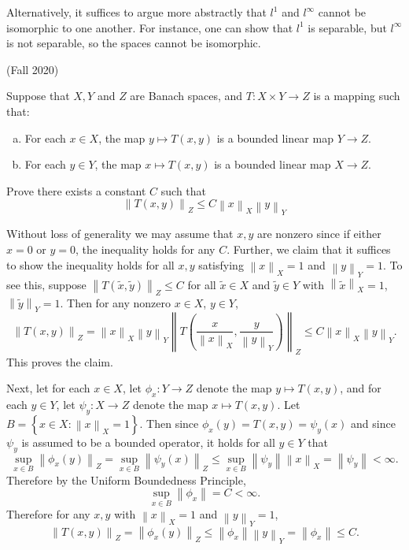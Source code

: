 \documentclass{exam}
\theoremstyle{problemstyle}
\newcommand{\norm}[1]{\left\lVert#1\right\rVert} %
\newcommand{\1}[1]{\textbf{1}_{\left[#1\right]}} %
\begin{document}
\begin{questions}
\begin{solution}
    Alternatively, it suffices to argue more abstractly that $l^1$ and $l^\infty$ cannot be isomorphic to one another. For instance, one can show that $l^1$ is separable, but $l^\infty$ is not separable, so the spaces cannot be isomorphic.
\end{solution}

\question (Fall 2020)

Suppose that $X,Y$ and $Z$ are Banach spaces, and $T:X\times Y\to Z$ is a mapping such that:
\begin{enumerate}[(a)]
\item For each $x\in X$, the map $y\mapsto T(x,y)$ is a bounded linear map $Y\to Z$.
\item For each $y\in Y$, the map $x\mapsto T(x,y)$ is a bounded linear map $X\to Z$.
\end{enumerate}
Prove there exists a constant $C$ such that
\begin{equation*}
\norm{T(x,y)}_{Z}\leq C \norm{x}_{X}\norm{y}_{Y}
\end{equation*}

\begin{solution}
  Without loss of generality we may assume that $x,y$ are nonzero since if either $x=0$ or $y=0$, the inequality holds for any $C$. Further, we claim that it suffices to show the inequality holds for all $x,y$ satisfying $\norm{x}_{X}=1$ and $\norm{y}_{Y}=1.$ To see this, suppose $\norm{T(\tilde{x},\tilde{y})}_{Z}\leq C$ for all $\tilde{x}\in X$ and $\tilde{y}\in Y$ with $\norm{\tilde{x}}_{X}=1$, $\norm{\tilde{y}}_{Y}=1$. Then for any nonzero $x\in X$, $y\in Y$,
  \begin{equation*}
    \norm{T(x,y)}_{Z}= \norm{x}_{X}\norm{y}_{Y}\norm{T \left( \frac{x}{\norm{x}_{X}},\frac{y}{\norm{y}_{Y}} \right)}_{Z} \leq C \norm{x}_{X}\norm{y}_{Y}.
  \end{equation*}
  This proves the claim.

  Next, let for each $x\in X$, let $\phi_{x}:Y\to Z$ denote the map $y\mapsto T(x,y)$, and for each $y\in Y$, let $\psi_{y}:X\to Z$ denote the map $x\mapsto T(x,y)$. Let $B= \left\{ x\in X: \norm{x}_{X}=1 \right\}$. Then since $\phi_{x}(y)=T(x,y)=\psi_{y}(x)$ and since $\psi_{y}$ is assumed to be a bounded operator, it holds for all $y\in Y$ that
  \begin{equation*}
    \sup_{x\in B}\norm{\phi_{x}(y)}_{Z} = \sup_{x\in B}\norm{\psi_{y}(x)}_{Z} \leq \sup_{x\in B}\norm{\psi_{y}} \norm{x}_{X} = \norm{\psi_{y}} <\infty.
  \end{equation*}
  Therefore by the Uniform Boundedness Principle,
  \begin{equation*}
    \sup_{x\in B}\norm{\phi_{x}}= C <\infty.
  \end{equation*}
  Therefore for any $x,y$ with $\norm{x}_{X}=1$ and $\norm{y}_{Y}=1$,
  \begin{equation*}
    \norm{T(x,y)}_{Z} = \norm{\phi_{x}(y)}_{Z}\leq \norm{\phi_{x}}\norm{y}_{Y} = \norm{\phi_{x}} \leq C.
  \end{equation*}
\end{solution}


\end{questions}
\end{document}

